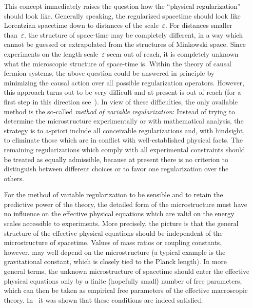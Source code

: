 \documentclass[reqno,11pt]{amsart}
\numberwithin{equation}{section}
\newcommand{\1}{\mbox{\rm 1 \hspace{-1.05 em} 1}}
\begin{document}
This concept immediately raises the question how the ``physical regularization'' should look like.
Generally speaking, the regularized spacetime should look like Lorentzian spacetime down to distances
of the scale~$\varepsilon$. For distances smaller than~$\varepsilon$, the structure of
space-time may be completely different, in a way which cannot be 
guessed or extrapolated from the structures of Minkowski space.
Since experiments on the length scale~$\varepsilon$ seem out of reach, it is completely
unknown what the microscopic structure of space-time is.
Within the theory of causal fermion systems, the above question could be answered in principle
by minimizing the causal action over all possible regularization operators.
However, this approach turns out to be very difficult and at present is out of reach
(for a first step in this direction see~\cite{reg}).
In view of these difficulties, the only available method is the so-called
{\em{method of variable regularization}}:
Instead of trying to determine the microstructure experimentally or with mathematical analysis,
the strategy is to a-priori include all conceivable regularizations and, with hindsight, to eliminate those
which are in conflict with well-established physical facts. The remaining regularizations which comply with all
experimental constraints should be treated as equally admissible, because at present
there is no criterion to distinguish between different choices or to favor one regularization over the others.

For the method of variable regularization to be sensible and to retain the predictive power of the theory,
the detailed form of the microstructure must have no influence
on the effective physical equations which are valid on the energy scales accessible to experiments.
More precisely, the picture is that the general structure of the effective physical equations should be independent
of the microstructure of spacetime. Values of mass ratios or coupling constants, however, may well
depend on the microstructure (a typical example is the gravitational constant, which is
closely tied to the Planck length).
In more general terms, the unknown microstructure
of spacetime should enter the effective physical equations only by a finite (hopefully
small) number of free parameters, which can then be taken as empirical free parameters
of the effective macroscopic theory. In~\cite{cfs} it was shown that these conditions are indeed
satisfied.
\end{document}
